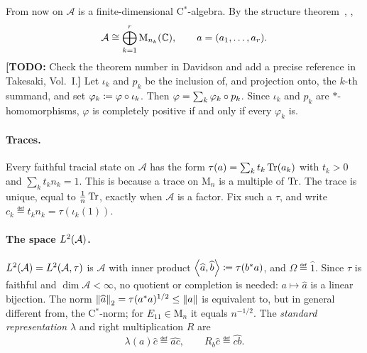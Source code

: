 \documentclass[12pt]{article}
\newcommand{\todo}[1]{\textcolor{\mysubcolor}{\small\textbf{[TODO:} #1\textbf{]}}}
\newcommand{\alg}{\mathcal{A}}             %
\newcommand{\Mn}[1]{\mathrm{M}_{#1}}       %
\newcommand{\ip}[2]{\left\langle #1 , #2 \right\rangle}
\newcommand{\Ltwo}{L^2\br{\alg}}
\newcommand{\vect}[1]{\widehat{#1}}
\begin{document}
From now on \(\alg\) is a finite-dimensional C\(^*\)-algebra. By the structure
theorem~\cite[Theorem~III.1.1]{Davidson1996}, \cite{Takesaki1979},
\begin{equation}
\label{eq:structure}
  \alg \cong \bigoplus_{k=1}^r \Mn{n_k}(\complex), \qquad a = (a_1, \dots, a_r).
\end{equation}
\todo{Check the theorem number in Davidson and add a precise reference in
Takesaki, Vol.~I.}
Let \(\iota_k\) and \(p_k\) be the inclusion of, and projection onto, the
\(k\)-th summand, and set \(\varphi_k \coloneqq \varphi \circ \iota_k\). Then
\(\varphi = \sum_k \varphi_k \circ p_k\). Since \(\iota_k\) and \(p_k\) are
\(*\)-homomorphisms, \(\varphi\) is completely positive if and only if every
\(\varphi_k\) is.

\paragraph{Traces.}
Every faithful tracial state on \(\alg\) has the form
\(\tau(a) = \sum_k t_k \operatorname{Tr}(a_k)\) with \(t_k > 0\) and \(\sum_k t_k n_k = 1\).
This is because a trace on \(\Mn{n}\) is a multiple of \(\operatorname{Tr}\). The trace is
unique, equal to \(\frac1n\operatorname{Tr}\), exactly when \(\alg\) is a factor. Fix such a
\(\tau\), and write \(c_k \eqdef t_k n_k = \tau(\iota_k(1))\).

\paragraph{The space \(\Ltwo\).}
\(\Ltwo = L^2(\alg, \tau)\) is \(\alg\) with inner product
\(\ip{\vect a}{\vect b} \eqdef \tau(b^\adjoint a)\), and \(\Omega \eqdef \vect 1\).
Since \(\tau\) is faithful and \(\dim \alg < \infty\), no quotient or completion is
needed: \(a \mapsto \vect a\) is a linear bijection. The norm
\(\norm{\vect a}_2 = \tau(a^\adjoint a)^{1/2} \le \norm a\) is equivalent to, but
in general different from, the C\(^*\)-norm; for \(E_{11} \in \Mn n\) it equals
\(n^{-1/2}\). The \emph{standard representation} \(\lambda\) and right
multiplication \(R\) are
\[
  \lambda(a)\vect c \eqdef \vect{ac}, \qquad R_b\vect c \eqdef \vect{cb}.
\]
\end{document}
